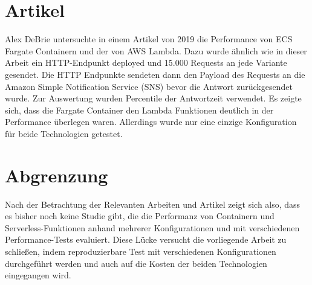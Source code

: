 \section{Artikel}
Alex DeBrie untersuchte in einem Artikel von 2019 die Performance von ECS Fargate Containern und der von AWS Lambda\cite{debrie_aws_2019}. Dazu wurde ähnlich wie in dieser Arbeit ein HTTP-Endpunkt deployed und 15.000 Requests an jede Variante gesendet. Die HTTP Endpunkte sendeten dann den Payload des Requests an die Amazon Simple Notification Service (SNS) bevor die Antwort zurückgesendet wurde. Zur Auswertung wurden Percentile der Antwortzeit verwendet. Es zeigte sich, dass die Fargate Container den Lambda Funktionen deutlich in der Performance überlegen waren. Allerdings wurde nur eine einzige Konfiguration für beide Technologien getestet.

\section{Abgrenzung}
Nach der Betrachtung der Relevanten Arbeiten und Artikel zeigt sich also, dass es bisher noch keine Studie gibt, die die Performanz von Containern und Serverless-Funktionen anhand mehrerer Konfigurationen und mit verschiedenen Performance-Tests evaluiert. Diese Lücke versucht die vorliegende Arbeit zu schließen, indem reproduzierbare Test mit verschiedenen Konfigurationen durchgeführt werden und auch auf die Kosten der beiden Technologien eingegangen wird.